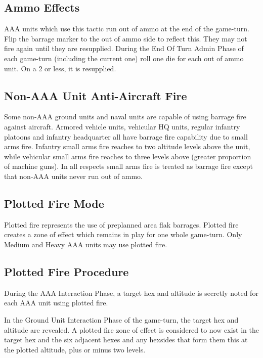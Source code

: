 \subsection{Ammo Effects} AAA units which use this tactic run out of ammo at the end of the game-turn. Flip the barrage marker to the out of ammo side to reflect this. They may not fire again until they are resupplied. During the End Of Turn Admin Phase of each game-turn (including the current one) roll one die for each out of ammo unit. On a 2 or less, it is resupplied.

\subsection{Non-AAA Unit Anti-Aircraft Fire} Some non-AAA ground units and naval units are capable of using barrage fire against aircraft. Armored vehicle units, vehicular HQ units, regular infantry platoons and infantry headquarter all have barrage fire capability due to small arms fire. Infantry small arms fire reaches to two altitude levels above the unit, while vehicular small arms fire reaches to three levels above (greater proportion of machine guns). In all respects small arms fire is treated as barrage fire except that non-AAA units never run out of ammo.

\subsection{Plotted Fire Mode}

Plotted fire represents the use of preplanned area flak barrages. Plotted fire creates a zone of effect which remains in play for one whole game-turn. Only Medium and Heavy AAA units may use plotted fire.

\subsection{Plotted Fire Procedure} During the AAA Interaction Phase, a target hex and altitude is secretly noted for each AAA unit using plotted fire.

In the Ground Unit Interaction Phase of the game-turn, the target hex and altitude are revealed. A plotted fire zone of effect is considered to now exist in the target hex and the six adjacent hexes and any hexsides that form them this at the plotted altitude, plus or minus two levels. 

